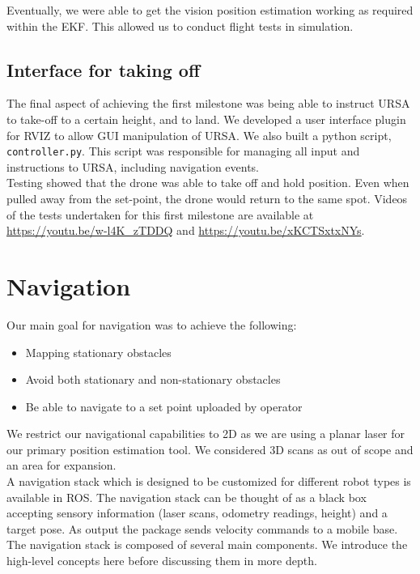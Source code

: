 \documentclass[capstone_report.tex]{subfiles}
\begin{document}
Eventually, we were able to get the vision position estimation working as required within the EKF. This allowed us to conduct flight tests in simulation.

\subsection{Interface for taking off}
The final aspect of achieving the first milestone was being able to instruct URSA to take-off to a certain height, and to land. We developed a user interface plugin for RVIZ to allow GUI manipulation of URSA. We also built a python script, \texttt{controller.py}. This script was responsible for managing all input and instructions to URSA, including navigation events.\\

Testing showed that the drone was able to take off and hold position. Even when pulled away from the set-point, the drone would return to the same spot. Videos of the tests undertaken for this first milestone are available at \url{https://youtu.be/w-l4K_zTDDQ} and \url{
https://youtu.be/xKCTSxtxNYs}.\\

\section{Navigation}
Our main goal for navigation was to achieve the following:

\begin{itemize}
    \item Mapping stationary obstacles
    \item Avoid both stationary and non-stationary obstacles
    \item Be able to navigate to a set point uploaded by operator
\end{itemize}

We restrict our navigational capabilities to 2D as we are using a planar laser for our primary position estimation tool. We considered 3D scans as out of scope and an area for expansion. \\

A navigation stack which is designed to be customized for different robot types is available in ROS. The navigation stack can be thought of as a black box accepting sensory information (laser scans, odometry readings, height) and a target pose. As output the package sends velocity commands to a mobile base.  The navigation stack is composed of several main components.  We introduce the high-level concepts here before discussing them in more depth.  \\
\end{document}

